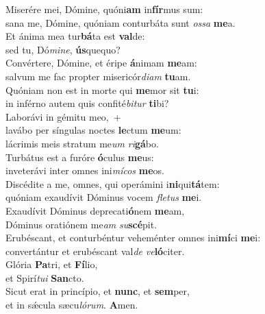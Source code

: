 \evenverse Miserére mei, Dómine, quóni\textbf{am} in\textbf{fír}mus sum:~\*\\
\evenverse sana me, Dómine, quóniam conturbáta sunt \textit{os}\textit{sa} \textbf{me}a.\\
\oddverse Et ánima mea tur\textbf{bá}ta est \textbf{val}de:~\*\\
\oddverse sed tu, Dó\textit{mi}\textit{ne}, \textbf{ús}quequo?\\
\evenverse Convértere, Dómine, et éripe \textbf{á}nimam \textbf{me}am:~\*\\
\evenverse salvum me fac propter misericór\textit{di}\textit{am} \textbf{tu}am.\\
\oddverse Quóniam non est in morte qui \textbf{me}mor sit \textbf{tu}i:~\*\\
\oddverse in inférno autem quis confité\textit{bi}\textit{tur} \textbf{ti}bi?\\
\evenverse Laborávi in gémitu meo,~+\\
\evenverse  lavábo per síngulas noctes \textbf{le}ctum \textbf{me}um:~\*\\
\evenverse lácrimis meis stratum me\textit{um} \textit{ri}\textbf{gá}bo.\\
\oddverse Turbátus est a furóre \textbf{ó}culus \textbf{me}us:~\*\\
\oddverse inveterávi inter omnes ini\textit{mí}\textit{cos} \textbf{me}os.\\
\evenverse Discédite a me, omnes, qui operámini i\textbf{ni}qui\textbf{tá}tem:~\*\\
\evenverse quóniam exaudívit Dóminus vocem \textit{fle}\textit{tus} \textbf{me}i.\\
\oddverse Exaudívit Dóminus deprecati\textbf{ó}nem \textbf{me}am,~\*\\
\oddverse Dóminus oratiónem me\textit{am} \textit{su}\textbf{scé}pit.\\
\evenverse Erubéscant, et conturbéntur veheménter omnes ini\textbf{mí}ci \textbf{me}i:~\*\\
\evenverse convertántur et erubéscant val\textit{de} \textit{ve}\textbf{ló}citer.\\
\oddverse Glória \textbf{Pa}tri, et \textbf{Fí}lio,~\*\\
\oddverse et Spirí\textit{tu}\textit{i} \textbf{San}cto.\\
\evenverse Sicut erat in princípio, et \textbf{nunc}, et \textbf{sem}per,~\*\\
\evenverse et in sǽcula sæcu\textit{ló}\textit{rum}. \textbf{A}men.\\
